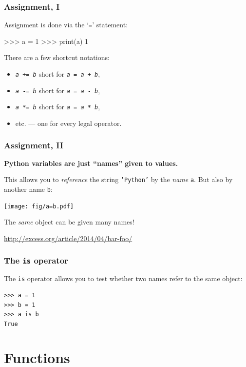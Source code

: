 \documentclass[english,serif,mathserif,xcolor=pdftex,dvipsnames,table]{beamer}
\begin{document}
\begin{frame}[fragile]
  \frametitle{Assignment, I}
  Assignment is done via the `\texttt{=}' statement:
\begin{semiverbatim}
>>> a = 1
>>> print(a)
1
\end{semiverbatim}

  \+
  There are a few shortcut notations:
  \begin{itemize}
  \item[] \texttt{\emph{a} += \emph{b}} short for \texttt{\emph{a} = \emph{a} + \emph{b}},
  \item[] \texttt{\emph{a} -= \emph{b}} short for \texttt{\emph{a} = \emph{a} - \emph{b}},
  \item[] \texttt{\emph{a} *= \emph{b}} short for \texttt{\emph{a} = \emph{a} * \emph{b}},
  \item[]   etc. --- one for every legal operator.
  \end{itemize}
\end{frame}


\begin{frame}[fragile]
  \frametitle{Assignment, II}

  \textbf{Python variables are just ``names'' given to values.}

  \+
  This allows you to \emph{reference} the string \texttt{'Python'}
  by the \emph{name} \texttt{a}.  But also by another name \texttt{b}:

  \+
  \texttt{[image: fig/a=b.pdf]}

  \+
  The \emph{same} object can be given many names!

  \+
  \begin{seealso}
    \scriptsize \url{http://excess.org/article/2014/04/bar-foo/}
  \end{seealso}
\end{frame}


\begin{frame}[fragile]
  \frametitle{The \texttt{is} operator}

  The \texttt{is} operator allows you to test whether two names refer
  to the same object:
\begin{lstlisting}
>>> a = 1
>>> b = 1
>>> a is b
True
\end{lstlisting}

\end{frame}


\section{Functions}
\end{document}
